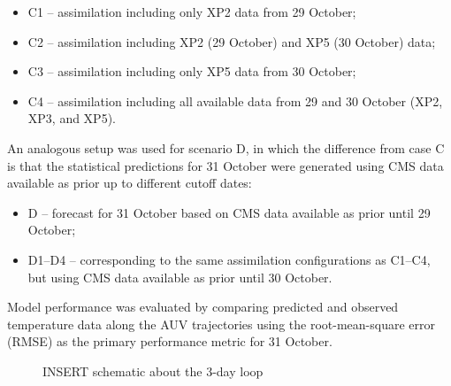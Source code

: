 \begin{itemize}
    \item C1 – assimilation including only XP2 data from 29 October;
    \item C2 – assimilation including XP2 (29 October) and XP5 (30 October) data;
    \item C3 – assimilation including only XP5 data from 30 October;
    \item C4 – assimilation including all available data from 29 and 30 October (XP2, XP3, and XP5).
\end{itemize}

An analogous setup was used for scenario D, in which the difference
from case C is that the statistical predictions for 31 October were
generated using CMS data available as prior up to different cutoff dates:

\begin{itemize}
    \item D – forecast for 31 October based on CMS data available as prior until 29 October;
    \item D1–D4 – corresponding to the same assimilation
      configurations as C1–C4, but using CMS data available as prior until 30
      October.
\end{itemize}

Model performance was evaluated by comparing predicted and observed
temperature data along the AUV trajectories using the root-mean-square
error (RMSE) as the primary performance metric for 31 October.

\begin{figure}
    \centering
    \caption{INSERT schematic about the 3-day loop}
    \label{fig:temperatureprofiles}
\end{figure}


%
    

